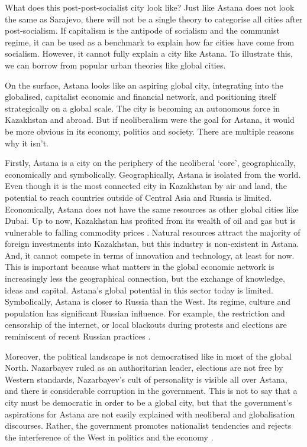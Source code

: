 \documentclass{article}
\begin{document}
What does this post-post-socialist city look like? Just like Astana does not look the same as Sarajevo, there will not be a single theory to categorise all cities after post-socialism. If capitalism is the antipode of socialism and the communist regime, it can be used as a benchmark to explain how far cities have come from socialism. However, it cannot fully explain a city like Astana. To illustrate this, we can borrow from popular urban theories like global cities.

On the surface, Astana looks like an aspiring global city, integrating into the globalised, capitalist economic and financial network, and positioning itself strategically on a global scale. The city is becoming an autonomous force in Kazakhstan and abroad.
But if neoliberalism were the goal for Astana, it would be more obvious in its economy, politics and society. There are multiple reasons why it isn't.

Firstly, Astana is a city on the periphery of the neoliberal `core', geographically, economically and symbolically.  
Geographically, Astana is isolated from the world. Even though it is the most connected city in Kazakhstan by air and land, the potential to reach countries outside of Central Asia and Russia is limited.
Economically, Astana does not have the same resources as other global cities like Dubai. Up to now, Kazakhstan has profited from its wealth of oil and gas but is vulnerable to falling commodity prices \parencite{batsaikhan2017central}. Natural resources attract the majority of foreign investments into Kazakhstan, but this industry is non-existent in Astana. And, it cannot compete in terms of innovation and technology, at least for now.
This is important because what matters in the global economic network is increasingly less the geographical connection, but the exchange of knowledge, ideas and capital. Astana's global potential in this sector today is limited.
Symbolically, Astana is closer to Russia than the West. Its regime, culture and population has significant Russian influence. For example, the restriction and censorship of the internet, or local blackouts during protests and elections are reminiscent of recent Russian practices \parencite{freedomhouse2021}.

Moreover, the political landscape is not democratised like in most of the global North. Nazarbayev ruled as an authoritarian leader, elections are not free by Western standards, Nazarbayev's cult of personality is visible all over Astana, and there is considerable corruption in the government. This is not to say that a city must be democratic in order to be a global city, but that the government's aspirations for Astana are not easily explained with neoliberal and globalisation discourses. Rather, the government promotes nationalist tendencies and rejects the interference of the West in politics and the economy \parencite{koch2013not}. 
\end{document}
